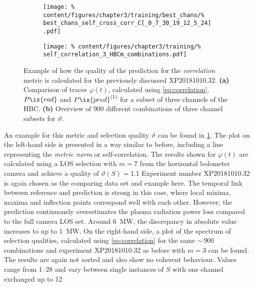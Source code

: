                 \begin{figure}[t]%
                    \centering%
                    \begin{subfigure}{0.47\textwidth}%
                        \texttt{[image: \%
                            content/figures/chapter3/training/best\_chans/\%
                            best\_chans\_self\_cross\_corr\_C[\_0\_7\_30\_19\_12\_5\_24].pdf]}%
                        \caption{}%
                    \end{subfigure}%
                    \hfill%
                    \begin{subfigure}{0.47\textwidth}%
                        \texttt{[image: \%
                            content/figures/chapter3/training/\%
                            self\_correlation\_3\_HBCm\_combinations.pdf]}%
                        \caption{}%
                    \end{subfigure}%
                    \caption{Example of how the quality of the prediction for the \textit{correlation} metric is calculated for the previously discussed XP20181010.32. \textbf{(a)} Comparison of traces $\varphi\left(t\right)$, calculated using \cref{eq:correlation}, $P\ix{rad}$ and $P\ix{pred}^{\left(1\right)}$ for a subset of three channels of the HBC. \textbf{(b)} Overview of 900 different combinations of three channel subsets for $\vartheta$.}\label{fig:correlation}%
                \end{figure}%
%
                An example for this metric and selection quality $\vartheta$ can be found in \cref{fig:correlation}. The plot on the left-hand side is presented in a way similar to before, including a line representing the \textit{metric norm} or self-correlation. The results shown for $\varphi\left(t\right)$ are calculated using a LOS selection with $m=7$ from the horizontal bolometer camera and achieve a quality of $\vartheta\left(S\right)=$\SI{1.1}{\arbitraryunit} Experiment number XP20181010.32 is again chosen as the comparing data set and example here. The temporal link between reference and prediction is strong in this case, where local minima, maxima and inflection points correspond well with each other. However, the prediction continuously overestimates the plasma radiation power loss compared to the full camera LOS set. Around \SI{6}{\mega\watt}, the discrepancy in absolute value increases to up to \SI{1}{\mega\watt}. On the right-hand side, a plot of the spectrum of selection qualities, calculated using \cref{eq:correlation} for the same $\sim$\,900 combinations and experiment XP20181010.32 as before with $m=3$ can be found. The results are again not sorted and also show no coherent behaviour. Values range from \SIrange{1}{28}{\arbitraryunit} and vary between single instances of $S$ with one channel exchanged up to \SI{12}{\arbitraryunit}\\%
